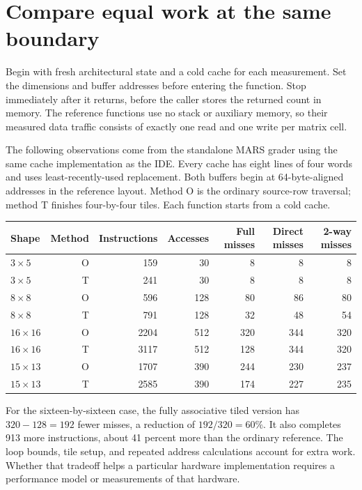 \section{Compare equal work at the same boundary}
Begin with fresh architectural state and a cold cache for each measurement. Set
the dimensions and buffer addresses before entering the function. Stop immediately
after it returns, before the caller stores the returned count in memory. The
reference functions use no stack or auxiliary memory, so their measured data
traffic consists of exactly one read and one write per matrix cell.

The following observations come from the standalone MARS grader using the same
cache implementation as the IDE. Every cache has eight lines of four words and
uses least-recently-used replacement. Both buffers begin at 64-byte-aligned
addresses in the reference layout. Method O is the ordinary source-row traversal;
method T finishes four-by-four tiles. Each function starts from a cold cache.

\begin{longtable}{lrrrrrr}
  \toprule
  Shape          & Method & Instructions & Accesses & Full misses & Direct misses & 2-way misses \\
  \midrule
  \(3\times5\)   & O      & 159          & 30       & 8           & 8             & 8            \\
  \(3\times5\)   & T      & 241          & 30       & 8           & 8             & 8            \\
  \(8\times8\)   & O      & 596          & 128      & 80          & 86            & 80           \\
  \(8\times8\)   & T      & 791          & 128      & 32          & 48            & 54           \\
  \(16\times16\) & O      & 2204         & 512      & 320         & 344           & 320          \\
  \(16\times16\) & T      & 3117         & 512      & 128         & 344           & 320          \\
  \(15\times13\) & O      & 1707         & 390      & 244         & 230           & 237          \\
  \(15\times13\) & T      & 2585         & 390      & 174         & 227           & 235          \\
  \bottomrule
\end{longtable}
For the sixteen-by-sixteen case, the fully associative tiled version has
\(320-128=192\) fewer misses, a reduction of \(192/320=60\%\). It also completes
913 more instructions, about 41 percent more than the ordinary reference.
The loop bounds, tile setup, and repeated address calculations account for
extra work. Whether that tradeoff helps a particular hardware implementation
requires a performance model or measurements of that hardware.

